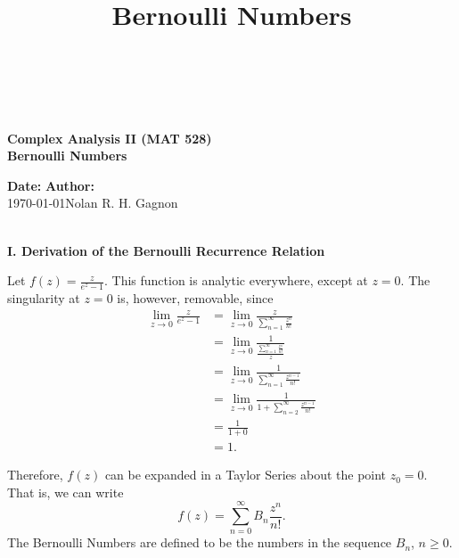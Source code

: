 \documentclass{article}
\title{Bernoulli Numbers}
\begin{document}
\begin{center}
\hrulefill \\
\vspace{-0.7cm}
\hrulefill \\
\vspace{-0.3cm}

\begin{Large}
\textbf{Complex Analysis II (MAT 528)} \\
\textbf{Bernoulli Numbers} \\
\end{Large}
\begin{large}
\end{large}
\vspace{-7mm}
\noindent \textbf{Date:} \hfill \textbf{Author:}\\
\noindent\today \hfill Nolan R. H. Gagnon \\

\vspace{-0.4cm}
\hrulefill \\
\vspace{-0.7cm}
\hrulefill
\end{center}

\vspace{7mm}

\noindent\begin{Large}\textbf{I. Derivation of the Bernoulli Recurrence Relation}\end{Large}

\noindent Let $f(z) = \frac{z}{e^z - 1}.$ This function is analytic everywhere, except at $z=0$.  The singularity at $z=0$ is, however, removable, since 
\begin{align}
\lim_{z\rightarrow 0} \frac{z}{e^z - 1} &= \lim_{z\rightarrow 0}\frac{z}{\sum\limits_{n=1}^{\infty} \frac{z^n}{n!}} \\
&= \lim_{z\rightarrow 0}\frac{1}{\frac{\sum_{n=1}^{\infty}\frac{z^n}{n!}}{z}} \\
&= \lim_{z\rightarrow 0}\frac{1}{\sum\limits_{n=1}^{\infty}\frac{z^{n-1}}{n!}} \\
&= \lim_{z\rightarrow 0} \frac{1}{1 + \sum\limits_{n=2}^{\infty}\frac{z^{n-1}}{n!}} \\
&= \frac{1}{1 + 0} \\
&= 1.
\end{align}

\noindent Therefore, $f(z)$ can be expanded in a Taylor Series about the point $z_0 = 0$.  That is, we can write
$$f(z) = \sum\limits_{n=0}^{\infty}B_n\frac{z^n}{n!}.$$ The Bernoulli Numbers are defined to be the numbers in the sequence $B_n$, $n\geq 0$.
\end{document}
